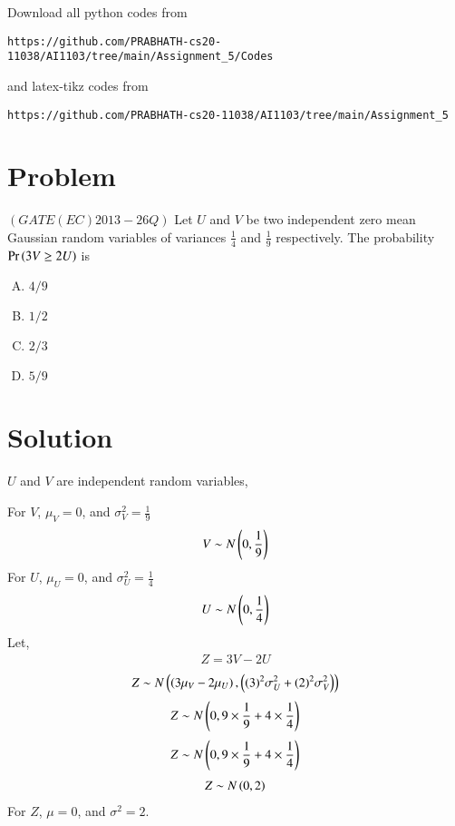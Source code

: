 \documentclass[journal,12pt,twocolumn]{IEEEtran}
\begin{document}
Download all python codes from 
\begin{lstlisting}
https://github.com/PRABHATH-cs20-11038/AI1103/tree/main/Assignment_5/Codes
\end{lstlisting}

and latex-tikz codes from
\begin{lstlisting}
https://github.com/PRABHATH-cs20-11038/AI1103/tree/main/Assignment_5
\end{lstlisting}

\section{Problem}

$(GATE(EC)2013-26Q)$ Let $U$ and $V$ be two independent zero mean Gaussian random variables of variances $\frac{1}{4}$ and $\frac{1}{9}$ respectively. The probability $\Pr\left(3V\geq2U \right)$ is

\begin{enumerate}[(A)]
    \item $4/9$
    \item $1/2$
    \item $2/3$
    \item $5/9$
\end{enumerate}

\section{Solution}

$U$ and $V$ are independent random variables,

For $V$, $\mu_V=0$, and $\sigma_V^2=\frac{1}{9}$
\begin{align}
    V\sim N\left(0,\frac{1}{9}\right)
\end{align}
For $U$, $\mu_U=0$, and $\sigma_U^2=\frac{1}{4}$
\begin{align}
    U\sim N\left(0,\frac{1}{4}\right)
\end{align}
Let,
\begin{align}
    Z=3V-2U
\end{align}
\begin{align}
    Z\sim N\left(\left(3\mu_V-2\mu_U\right), \left((3)^2\sigma_U^2+(2)^2\sigma_V^2\right)\right)
\end{align}
\begin{align}
    Z\sim N\left(0,9\times\frac{1}{9}+4\times\frac{1}{4}\right)
\end{align}
\begin{align}
    Z\sim N\left(0,9\times\frac{1}{9}+4\times\frac{1}{4}\right)
\end{align}
\begin{align}
    Z\sim N\left(0,2\right)
\end{align}
For $Z$, $\mu=0$, and $\sigma^2=2$.
\end{document}
